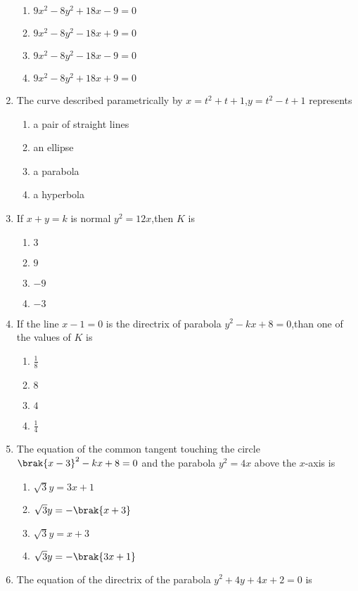 \begin{enumerate}
    \hfill {}
\begin{enumerate}
    \item $9x^2-8y^2+18x-9=0$
    \item $9x^2-8y^2-18x+9=0$
    \item $9x^2-8y^2-18x-9=0$
    \item $9x^2-8y^2+18x+9=0$
\end{enumerate}
\item The curve described parametrically by $x=t^2+t+1$,$y=t^2-t+1$ represents
     \hfill{}
\begin{enumerate}
    \item a pair of straight lines
    \item an ellipse
    \item a parabola
    \item a hyperbola
\end{enumerate}
\item If $x+y=k$ is normal $y^2=12x$,then $K$ is
     \hfill{}
\begin{enumerate}
    \item $3$
    \item $9$
    \item $-9$
    \item $-3$
\end{enumerate}
\item If the line $x-1=0$ is the directrix of parabola $y^2-kx+8=0$,than one of the values of $K$ is
      \hfill{}
\begin{enumerate}
    \item $\frac{1}{8}$
    \item $8$
    \item $4$
    \item $\frac{1}{4}$ 
\end{enumerate}
\item The equation of the common tangent touching the circle $\brak{x-3}^2-kx+8=0$ and the parabola $y^2=4x$ above the $x$-axis is 
      \hfill{}
\begin{enumerate}
    \item $\sqrt{3}y=3x+1$
    \item $\sqrt{3}y=-\brak{x+3}$
    \item $\sqrt{3}y=x+3$
    \item $\sqrt{3}y=-\brak{3x+1}$
\end{enumerate}
    \item The equation of the directrix of the parabola $y^2+4y+4x+2=0$ is 

\end{enumerate}
